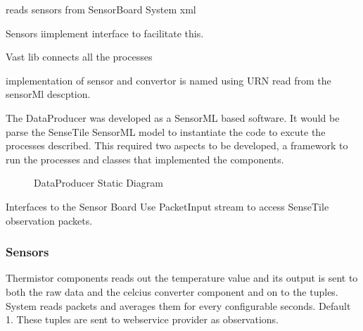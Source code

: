 \documentclass[]{final_report}
\begin{document}
reads sensors from SensorBoard System xml

Sensors iimplement interface to facilitate this.

Vast lib connects all the processes

implementation of sensor and convertor is named using URN read from the sensorMl descption.


The DataProducer was developed as a SensorML based software. It would be parse the SenseTile SensorML model to instantiate the code to excute the processes described. This required two aspects to be developed, a framework to run the processes and classes that implemented the components.

\begin{figure}[h]
\caption{DataProducer Static Diagram}\label{fig:sensetile_static_diagam.png}
\end{figure}

Interfaces to the Sensor Board
Use PacketInput stream to access SenseTile observation packets.

\subsubsection{Sensors}

Thermistor components reads out the temperature value
and its output is sent to both the raw data and the celcius
converter component and on to the tuples. System reads packets
and averages them for every configurable seconds. Default 1.
These tuples are sent to webservice provider as observations.
\end{document}
